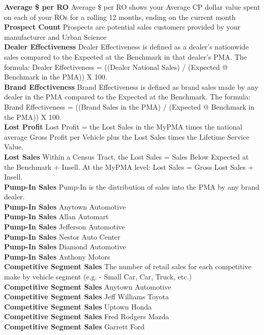 \documentclass[11pt,a4paper,oneside]{article}
\begin{document}
\textbf{Average \$ per RO} Average \$ per RO shows your Average CP dollar value spent on each of your ROs for a rolling 12 months, ending on the current month\\
\textbf{Prospect Count} Prospects are potential sales customers provided by your manufacturer and Urban Science\\
\textbf{Dealer Effectiveness} Dealer Effectiveness is defined as a dealer's nationwide sales compared to the Expected at the Benchmark in that dealer's PMA. The formula: Dealer Effectiveness = ((Dealer National Sales) / (Expected @ Benchmark in the PMA)) X 100. \\
\textbf{Brand Effectiveness} Brand Effectiveness is defined as brand sales made by any dealer in the PMA compared to the Expected at the Benchmark. The formula: Brand Effectiveness = ((Brand Sales in the PMA) / (Expected @ Benchmark in the PMA)) X 100.\\
\textbf{Lost Profit} Lost Profit = the Lost Sales in the MyPMA times the national average Gross Profit per Vehicle plus the Lost Sales times the Lifetime Service Value.\\
\textbf{Lost Sales} Within a Census Tract, the Lost Sales = Sales Below Expected at the Benchmark + Insell. At the MyPMA level: Lost Sales = Gross Lost Sales + Insell.\\
\textbf{Pump-In Sales} Pump-In is the distribution of sales into the PMA by any brand dealer.\\
\textbf{Pump-In Sales} Anytown Automotive\\
\textbf{Pump-In Sales} Allan Automart\\
\textbf{Pump-In Sales} Jefferson Automotive\\
\textbf{Pump-In Sales} Nestor Auto Center\\
\textbf{Pump-In Sales} Diamond Automotive\\
\textbf{Pump-In Sales} Anthony Motors\\
\textbf{Competitive Segment Sales} The number of retail sales for each competitive make by vehicle segment (e.g. - Small Car, Car, Truck, etc.)\\
\textbf{Competitive Segment Sales} Anytown Automotive\\
\textbf{Competitive Segment Sales} Jeff Williams Toyota\\
\textbf{Competitive Segment Sales} Uptown Honda\\
\textbf{Competitive Segment Sales} Fred Rodgers Mazda\\
\textbf{Competitive Segment Sales} Garrett Ford\\
\end{document}
